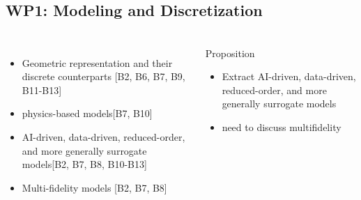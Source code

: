 \subsection{WP1: Modeling and Discretization}
\begin{frame}
  \frametitle{\insertsectionhead}
  \framesubtitle{\insertsubsectionhead}

  \begin{columns}
    \begin{itemize}
      \item Geometric representation and their discrete counterparts [B2, B6, B7, B9, B11-B13] 
      \item physics-based models[B7, B10] 
      \item AI-driven, data-driven, reduced-order, and more generally surrogate models[B2, B7, B8, B10-B13]
      \item Multi-fidelity models [B2, B7, B8]
    \end{itemize}

    \begin{alertblock}{Proposition}
    \begin{itemize}
      \item Extract AI-driven, data-driven, reduced-order, and more generally surrogate models
      \item need to discuss multifidelity
    \end{itemize}
  \end{alertblock}


  \end{columns}


\end{frame}

